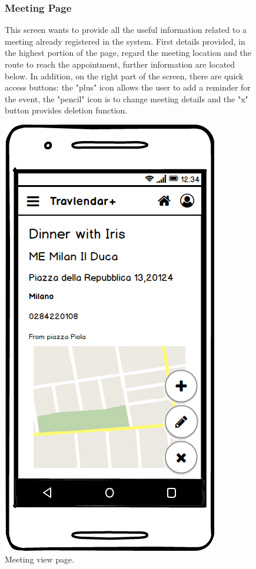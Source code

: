 	\begin{figure}
			\begin{flushleft}
			\subsubsection{Meeting Page}
			This screen wants to provide all the useful information related to a meeting already registered in the system. First details provided, in the highest portion of the page, regard the meeting location and the route to reach the appointment, further information are located below. In addition, on the right part of the screen, there are quick access buttons: the "plus" icon allows the user to add a reminder for the event, the "pencil" icon is to change meeting details and the "x" button provides deletion function. 
		\end{flushleft}
	\centering
	\includegraphics[width=0.6\linewidth]{mockups/MeetingView}
	\caption{Meeting view page. }
	\label{fig:meeting-view}
	\end{figure}
\clearpage

